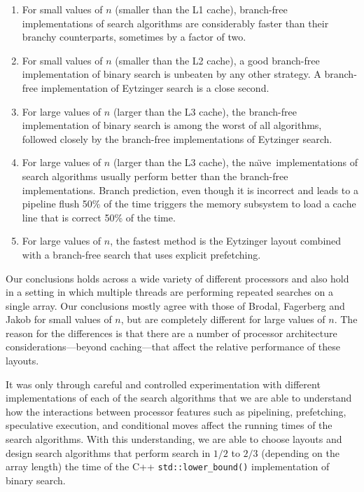 \documentclass{patmorin}
\newcommand{\naive}{na\"{\i}ve}
\begin{document}
\begin{enumerate}
  \item For small values of $n$ (smaller than the L1 cache), branch-free
    implementations of search algorithms are considerably faster than their
    branchy counterparts, sometimes by a factor of two.
  
  \item For small values of $n$ (smaller than the L2 cache), a good
    branch-free implementation of binary search is unbeaten by any other
    strategy.  A branch-free implementation of Eytzinger search is a
    close second.
  
  \item For large values of $n$ (larger than the L3 cache), the branch-free
    implementation of binary search is among the worst of all algorithms,
    followed closely by the branch-free implementations of Eytzinger
    search.
  
  \item For large values of $n$ (larger than the L3 cache), the \naive\
    implementations of search algorithms usually perform better than the
    branch-free implementations.  Branch prediction, even though it is
    incorrect and leads to a pipeline flush 50\% of the time triggers
    the memory subsystem to load a cache line that is correct 50\%
    of the time.  

  \item For large values of $n$, the fastest method is the Eytzinger
   layout combined with a branch-free search that uses explicit prefetching.
\end{enumerate}

Our conclusions holds across a wide variety of different processors and
also hold in a setting in which multiple threads are performing repeated
searches on a single array.  Our conclusions mostly agree with those of
Brodal, Fagerberg and Jakob for small values of $n$, but are completely
different for large values of $n$.  The reason for the differences is
that there are a number of processor architecture considerations---beyond
caching---that affect the relative performance of these layouts.

It was only through careful and controlled experimentation with different
implementations of each of the search algorithms that we are able
to understand how the interactions between processor features such
as pipelining, prefetching, speculative execution, and conditional
moves affect the running times of the search algorithms.  With this
understanding, we are able to choose layouts and design search algorithms
that perform search in $1/2$ to $2/3$ (depending on the array length)
the time of the C++ \texttt{std::lower_bound()} implementation
of binary search.
\end{document}
